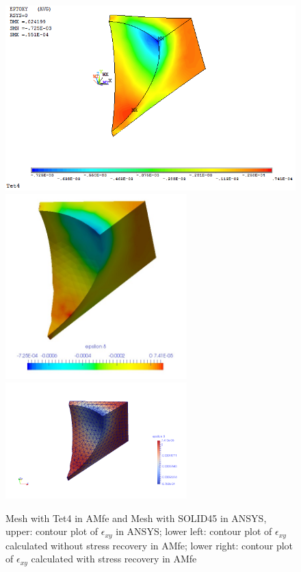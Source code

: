 \begin{figure}[htbp]
	\begin{center}
		\includegraphics[width=13cm,clip]{Tet4Exy.png} 	
		\includegraphics[width=7cm,clip]{Tet4ExyPD.png} 			
		\includegraphics[width=7cm,clip]{Tet4ExyP.png} 		
		\caption{Mesh with Tet4 in AMfe and Mesh with SOLID45 in ANSYS, upper: contour plot of $\epsilon_{xy}$ in ANSYS; lower left: contour plot of $\epsilon_{xy}$ calculated without stress recovery in AMfe; lower right: contour plot of $\epsilon_{xy}$ calculated with stress recovery in AMfe} \label{fig: Tet4_Exy}
	\end{center}
\end{figure}
\clearpage 

